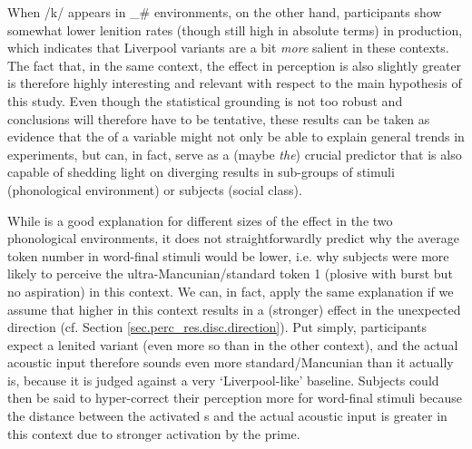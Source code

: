 When /k/ appears in \_\# environments, on the other hand, participants show somewhat lower lenition rates (though still high in absolute terms) in production, which indicates that Liverpool variants are a bit \emph{more} salient in these contexts.
The fact that, in the same context, the  effect in perception is also slightly greater is therefore highly interesting and relevant with respect to the main hypothesis of this study.
Even though the statistical grounding is not too robust and conclusions will therefore have to be tentative, these results can be taken as evidence that the  of a variable might not only be able to explain general trends in   experiments, but can, in fact, serve as a (maybe \emph{the}) crucial predictor that is also capable of shedding light on diverging results in sub-groups of stimuli (phonological environment) or subjects (social class).

While  is a good explanation for different sizes of the  effect in the two phonological environments, it does not straightforwardly predict why the average token number in word-final stimuli would be lower, i.e. why subjects were more likely to perceive the ultra-Mancunian/standard token 1 (plosive with burst but no aspiration) in this context.
We can, in fact, apply the same explanation if we assume that higher  in this context results in a (stronger)  effect in the unexpected direction (cf. Section \ref{sec.perc_res.disc.direction}).
Put simply, participants expect a lenited variant (even more so than in the other context), and the actual acoustic input therefore sounds even more standard/Mancunian than it actually is, because it is judged against a very `Liverpool-like' baseline.
Subjects could then be said to hyper-correct their perception more for word-final stimuli because the distance between the activated s and the actual acoustic input is greater in this context due to stronger activation by the prime.

